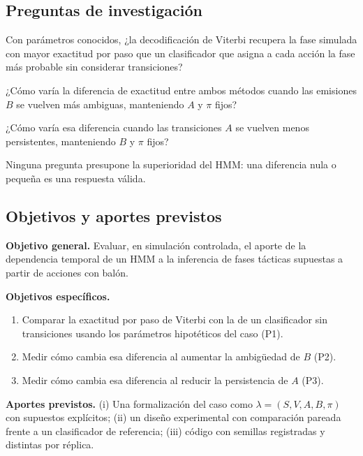 \documentclass[11pt,a4paper]{article}
\begin{document}
\subsection{Preguntas de investigación}

\begin{description}[leftmargin=1.2cm]
  \item[P1:] Con parámetros conocidos, ¿la decodificación de Viterbi recupera
  la fase simulada con mayor exactitud por paso que un clasificador que asigna a
  cada acción la fase más probable sin considerar transiciones?
  \item[P2:] ¿Cómo varía la diferencia de exactitud entre ambos métodos cuando
  las emisiones $B$ se vuelven más ambiguas, manteniendo $A$ y $\pi$ fijos?
  \item[P3:] ¿Cómo varía esa diferencia cuando las transiciones $A$ se vuelven
  menos persistentes, manteniendo $B$ y $\pi$ fijos?
\end{description}

Ninguna pregunta presupone la superioridad del HMM: una diferencia nula o
pequeña es una respuesta válida.

\subsection{Objetivos y aportes previstos}

\textbf{Objetivo general.} Evaluar, en simulación controlada, el aporte de la
dependencia temporal de un HMM a la inferencia de fases tácticas supuestas a
partir de acciones con balón.

\textbf{Objetivos específicos.}
\begin{enumerate}
  \item Comparar la exactitud por paso de Viterbi con la de un clasificador sin
        transiciones usando los parámetros hipotéticos del caso (P1).
  \item Medir cómo cambia esa diferencia al aumentar la ambigüedad de $B$ (P2).
  \item Medir cómo cambia esa diferencia al reducir la persistencia de $A$ (P3).
\end{enumerate}

\textbf{Aportes previstos.}
(i) Una formalización del caso como $\lambda=(S,V,A,B,\pi)$ con supuestos
explícitos; (ii) un diseño experimental con comparación pareada frente a un
clasificador de referencia; (iii) código con semillas registradas y distintas
por réplica.

\end{document}
